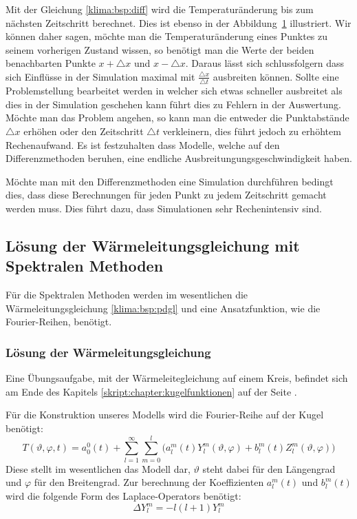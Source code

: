 \begin{refsection}
\begin{figure}
\caption{
\label{klima:wettervorhersagen:diff}}
\end{figure}
Mit der Gleichung \eqref{klima:bsp:diff} wird die Temperaturänderung bis zum nächsten Zeitschritt berechnet. Dies ist ebenso in der Abbildung~\ref{klima:wettervorhersagen:diff} illustriert. Wir können daher sagen, möchte man die Temperaturänderung eines Punktes zu seinem vorherigen Zustand wissen, so benötigt man die Werte der beiden benachbarten Punkte $x+\triangle x$ und $x-\triangle x$. Daraus lässt sich schlussfolgern dass sich Einflüsse in der Simulation maximal mit $\frac{\triangle x}{\triangle t}$ ausbreiten können. Sollte eine Problemstellung bearbeitet werden in welcher sich etwas schneller ausbreitet als dies in der Simulation geschehen kann führt dies zu Fehlern in der Auswertung. Möchte man das Problem angehen, so kann man die entweder die Punktabstände $\triangle x$ erhöhen oder den Zeitschritt $\triangle t$ verkleinern, dies führt jedoch zu erhöhtem Rechenaufwand. Es ist festzuhalten dass Modelle, welche auf den Differenzmethoden beruhen, eine endliche Ausbreitungungsgeschwindigkeit haben.

Möchte man mit den Differenzmethoden eine Simulation durchführen bedingt dies, dass diese Berechnungen für jeden Punkt zu jedem Zeitschritt gemacht werden muss. Dies führt dazu, dass Simulationen sehr Rechenintensiv sind.


\subsection{Lösung der Wärmeleitungsgleichung mit Spektralen Methoden}
Für die Spektralen Methoden werden im wesentlichen die Wärmeleitungsgleichung \eqref{klima:bsp:pdgl}
und eine Ansatzfunktion, wie die Fourier-Reihen, benötigt.


\subsubsection{Lösung der Wärmeleitungsgleichung}
Eine Übungsaufgabe, mit der Wärmeleitegleichung auf einem Kreis, befindet sich am Ende des Kapitels \ref{skript:chapter:kugelfunktionen}  auf der Seite \pageref{skript:1101:pdgl}.

Für die Konstruktion unseres Modells wird die Fourier-Reihe auf der Kugel benötigt:
\begin{equation}
T(\vartheta ,\varphi ,t)
=
a^0_0(t) + \sum_{l=1}^\infty\sum_{m=0}^l \bigl( a^m_l(t)Y^m_l(\vartheta ,\varphi)+b^m_l(t)Z^m_l(\vartheta ,\varphi)\bigr)
\label{equation:klima:fourier}
\end{equation}
Diese stellt im wesentlichen das Modell dar, $\vartheta$ steht dabei für den Längengrad und $\varphi$ für den Breitengrad. Zur berechnung der Koeffizienten $a^m_l(t)$ und $b^m_l(t)$ wird die folgende Form des Laplace-Operators benötigt:
\begin{equation}
\Delta Y^m_l=-l(l+1)Y^m_l
\label{equation:klima:laplace}
\end{equation}


\end{refsection}

